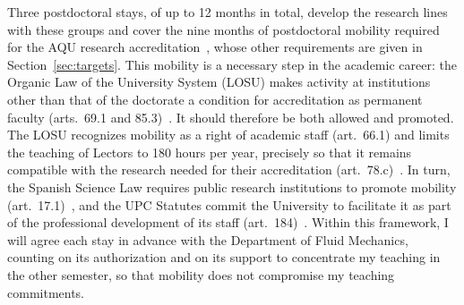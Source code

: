 \documentclass[11pt]{article}
\begin{document}
Three postdoctoral stays, of up to 12 months in total, develop the research lines with these groups
and cover the nine months of postdoctoral mobility required for the AQU research
accreditation~\cite{AQU2025}, whose other requirements are given in Section~\ref{sec:targets}.
This mobility is a necessary step in the academic career: the Organic Law of the University System
(LOSU) makes activity at institutions other than that of the doctorate a condition for
accreditation as permanent faculty (arts.~69.1 and 85.3)~\cite{LOSU2023}. It should therefore be
both allowed and promoted. The LOSU recognizes mobility as a right of academic staff (art.~66.1)
and limits the teaching of Lectors to 180 hours per year, precisely so that it remains compatible
with the research needed for their accreditation (art.~78.c)~\cite{LOSU2023}. In turn, the Spanish
Science Law requires public research institutions to promote mobility (art.~17.1)~\cite{LCTI2011},
and the UPC Statutes commit the University to facilitate it as part of the professional development
of its staff (art.~184)~\cite{UPCStatutes2025}. Within this framework, I will agree each stay in
advance with the Department of Fluid Mechanics, counting on its authorization and on its support to
concentrate my teaching in the other semester, so that mobility does not compromise my teaching
commitments.
\end{document}
